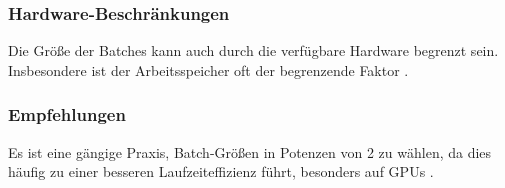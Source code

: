 \subsubsection{Hardware-Beschränkungen}
Die Größe der Batches kann auch durch die verfügbare Hardware begrenzt sein. Insbesondere ist der Arbeitsspeicher oft der begrenzende Faktor \cite{aggarwal_neural_networks_2018}.

\subsubsection{Empfehlungen}
Es ist eine gängige Praxis, Batch-Größen in Potenzen von 2 zu wählen, da dies häufig zu einer besseren Laufzeiteffizienz führt, besonders auf GPUs \cite{Goodfellow-et-al-2016}.
